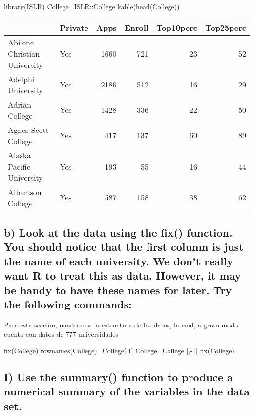 \documentclass[
  12pt,
  letterpaper,
]{article}
\newenvironment{Shaded}{\begin{snugshade}}{\end{snugshade}}
\newcommand{\DecValTok}[1]{\textcolor[rgb]{0.00,0.00,0.81}{#1}}
\newcommand{\FunctionTok}[1]{\textcolor[rgb]{0.00,0.00,0.00}{#1}}
\newcommand{\NormalTok}[1]{#1}
\newcommand{\OtherTok}[1]{\textcolor[rgb]{0.56,0.35,0.01}{#1}}
\newcommand{\SpecialCharTok}[1]{\textcolor[rgb]{0.00,0.00,0.00}{#1}}
\begin{document}
\begin{Shaded}
\begin{Highlighting}[]
\FunctionTok{library}\NormalTok{(ISLR)}
\NormalTok{College}\OtherTok{=}\NormalTok{ISLR}\SpecialCharTok{::}\NormalTok{College}
\FunctionTok{kable}\NormalTok{(}\FunctionTok{head}\NormalTok{(College))}
\end{Highlighting}
\end{Shaded}

\begin{tabular}{l|l|r|r|r|r}
\hline
  & Private & Apps & Enroll & Top10perc & Top25perc\\
\hline
Abilene Christian University & Yes & 1660 & 721 & 23 & 52\\
\hline
Adelphi University & Yes & 2186 & 512 & 16 & 29\\
\hline
Adrian College & Yes & 1428 & 336 & 22 & 50\\
\hline
Agnes Scott College & Yes & 417 & 137 & 60 & 89\\
\hline
Alaska Pacific University & Yes & 193 & 55 & 16 & 44\\
\hline
Albertson College & Yes & 587 & 158 & 38 & 62\\
\hline
\end{tabular}

\subsection{b) Look at the data using the fix() function. You should notice that the first column is just the name of each university. We don’t really want R to treat this as data. However, it may be handy to have these names for later. Try the following commands:}

Para esta sección, mostramos la estructura de los datos, la cual, a
groso modo cuenta con datos de 777 universidades

\begin{Shaded}
\begin{Highlighting}[]
\FunctionTok{fix}\NormalTok{(College)}
\FunctionTok{rownames}\NormalTok{(College)}\OtherTok{=}\NormalTok{College[,}\DecValTok{1}\NormalTok{]}
\NormalTok{College}\OtherTok{=}\NormalTok{College [,}\SpecialCharTok{{-}}\DecValTok{1}\NormalTok{]}
\FunctionTok{fix}\NormalTok{(College)}
\end{Highlighting}
\end{Shaded}

\subsection{I) Use the summary() function to produce a numerical summary of the variables in the data set.}
\end{document}

